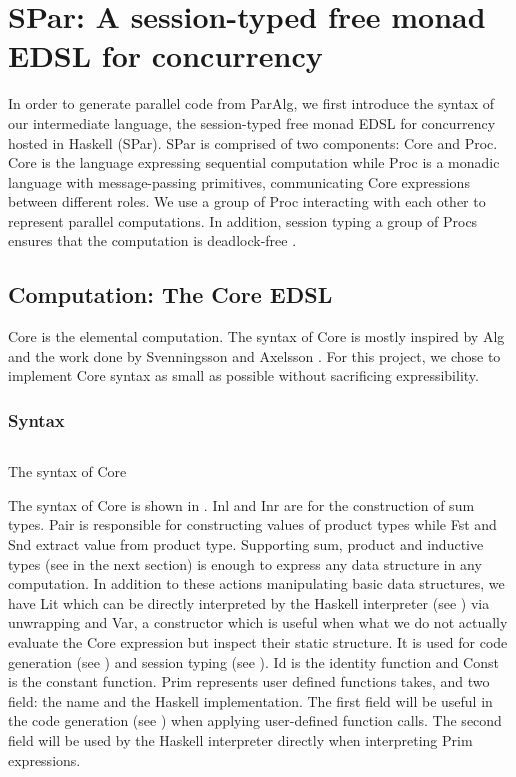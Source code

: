 \chapter{SPar: A session-typed free monad EDSL for concurrency} \label{chap:spar}
In order to generate parallel code from ParAlg, we first introduce the syntax of our intermediate language, the session-typed free monad EDSL for concurrency hosted in Haskell (SPar). SPar is comprised of two components: Core and Proc. Core is the language expressing sequential computation while Proc is a monadic language with message-passing primitives, communicating Core expressions between different roles. We use a group of Proc interacting with each other to represent parallel computations. In addition, session typing a group of Procs ensures that the computation is deadlock-free \cite{langeVerifyingAsynchronousInteractions2019}.
\section{Computation: The Core EDSL}
Core is the elemental computation. The syntax of Core is mostly inspired by Alg \cite{AlgebraicMultipartyProtocol} and the work done by Svenningsson and Axelsson \cite{svenningssonCombiningDeepShallow2015}. For this project, we chose to implement Core syntax as small as possible without sacrificing expressibility.
\subsection{Syntax}
\begin{listing}[ht]
    \inputminted{Haskell}{spar/core.hs}
    \caption{The syntax of Core}
    \label{spar:code:core}
\end{listing}
The syntax of Core is shown in . Inl and Inr are for the construction of sum types. Pair is responsible for constructing values of product types while Fst and Snd extract value from product type. Supporting sum, product and inductive types (see in the next section) is enough to express any data structure in any computation. In addition to these actions manipulating basic data structures, we have Lit which can be directly interpreted by the Haskell interpreter (see ) via unwrapping and Var, a constructor which is useful when what we do not actually evaluate the Core expression but inspect their static structure. It is used for code generation (see ) and session typing (see ). Id is the identity function and Const is the constant function. Prim represents user defined functions takes, and two field: the name and the Haskell implementation. The first field will be useful in the code generation (see ) when applying user-defined function calls. The second field will be used by the Haskell interpreter directly when interpreting Prim expressions.    

